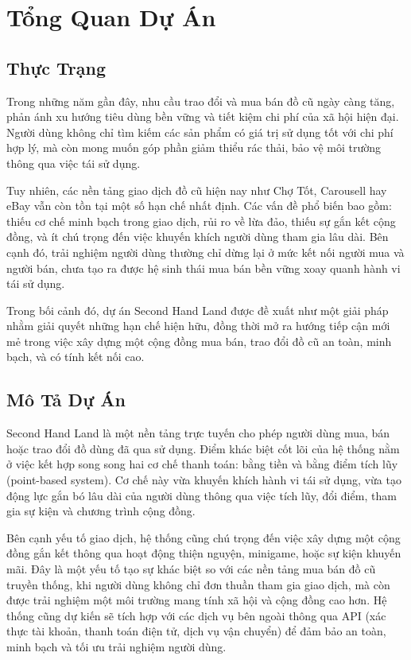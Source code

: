 \documentclass{article}
\begin{document}
\newpage
\section{Tổng Quan Dự Án}
\subsection{Thực Trạng}

\quad Trong những năm gần đây, nhu cầu trao đổi và mua bán đồ cũ ngày càng tăng, phản ánh xu hướng tiêu dùng bền vững và tiết kiệm chi phí của xã hội hiện đại. Người dùng không chỉ tìm kiếm các sản phẩm có giá trị sử dụng tốt với chi phí hợp lý, mà còn mong muốn góp phần giảm thiểu rác thải, bảo vệ môi trường thông qua việc tái sử dụng.

\quad Tuy nhiên, các nền tảng giao dịch đồ cũ hiện nay như Chợ Tốt, Carousell hay eBay vẫn còn tồn tại một số hạn chế nhất định. Các vấn đề phổ biến bao gồm: thiếu cơ chế minh bạch trong giao dịch, rủi ro về lừa đảo, thiếu sự gắn kết cộng đồng, và ít chú trọng đến việc khuyến khích người dùng tham gia lâu dài. Bên cạnh đó, trải nghiệm người dùng thường chỉ dừng lại ở mức kết nối người mua và người bán, chưa tạo ra được hệ sinh thái mua bán bền vững xoay quanh hành vi tái sử dụng.

\quad Trong bối cảnh đó, dự án Second Hand Land được đề xuất như một giải pháp nhằm giải quyết những hạn chế hiện hữu, đồng thời mở ra hướng tiếp cận mới mẻ trong việc xây dựng một cộng đồng mua bán, trao đổi đồ cũ an toàn, minh bạch, và có tính kết nối cao.  
\subsection{Mô Tả Dự Án} 
\quad Second Hand Land là một nền tảng trực tuyến cho phép người dùng mua, bán hoặc trao đổi đồ dùng đã qua sử dụng. Điểm khác biệt cốt lõi của hệ thống nằm ở việc kết hợp song song hai cơ chế thanh toán: bằng tiền và bằng điểm tích lũy (point-based system). Cơ chế này vừa khuyến khích hành vi tái sử dụng, vừa tạo động lực gắn bó lâu dài của người dùng thông qua việc tích lũy, đổi điểm, tham gia sự kiện và chương trình cộng đồng.

\quad Bên cạnh yếu tố giao dịch, hệ thống cũng chú trọng đến việc xây dựng một cộng đồng gắn kết thông qua hoạt động thiện nguyện, minigame, hoặc sự kiện khuyến mãi. Đây là một yếu tố tạo sự khác biệt so với các nền tảng mua bán đồ cũ truyền thống, khi người dùng không chỉ đơn thuần tham gia giao dịch, mà còn được trải nghiệm một môi trường mang tính xã hội và cộng đồng cao hơn. Hệ thống cũng dự kiến sẽ tích hợp với các dịch vụ bên ngoài thông qua API (xác thực tài khoản, thanh toán điện tử, dịch vụ vận chuyển) để đảm bảo an toàn, minh bạch và tối ưu trải nghiệm người dùng.
\end{document}
